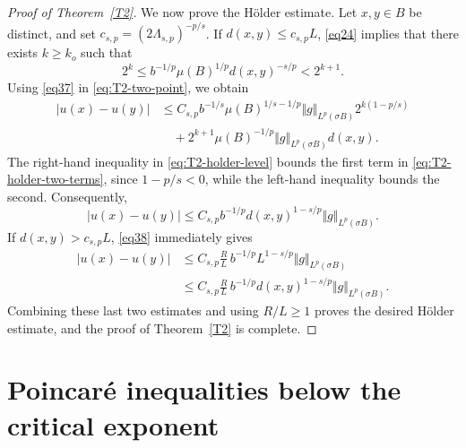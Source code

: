 \documentclass[12pt,leqno]{amsart}
\theoremstyle{definition}
\numberwithin{theorem}{section} \numberwithin{equation}{section}
\begin{document}
\begin{proof}[Proof of Theorem~\ref{T2}]
We now prove the H\"older estimate.
Let $x,y\in B$ be distinct, and set
$c_{s,p}=(2\Lambda_{s,p})^{-p/s}$.
If $d(x,y)\leq c_{s,p}L$, \eqref{eq24} implies that there exists
$k\geq k_o$ such that
%
\begin{equation}
\label{eq:T2-holder-level}
 2^k\leq b^{-1/p}\mu(B)^{1/p}d(x,y)^{-s/p}<2^{k+1}.
\end{equation}
%
Using \eqref{eq37} in \eqref{eq:T2-two-point}, we obtain
%
\begin{equation}
\label{eq:T2-holder-two-terms}
\begin{split}
 |u(x)-u(y)|
 &\leq C_{s,p}b^{-1/s}\mu(B)^{1/s-1/p}
       \Vert g\Vert_{L^p(\sigma B)}2^{k(1-p/s)}\\
 &\quad+2^{k+1}\mu(B)^{-1/p}
       \Vert g\Vert_{L^p(\sigma B)}d(x,y).
\end{split}
\end{equation}
The right-hand inequality in \eqref{eq:T2-holder-level} bounds the
first term in \eqref{eq:T2-holder-two-terms}, since $1-p/s<0$,
while the left-hand inequality bounds the second. Consequently,
\[
 |u(x)-u(y)|
 \leq C_{s,p}b^{-1/p}d(x,y)^{1-s/p}
       \Vert g\Vert_{L^p(\sigma B)}.
\]
If $d(x,y)>c_{s,p}L$, \eqref{eq38} immediately gives
\[
\begin{split}
 |u(x)-u(y)|
 &\leq C_{s,p}\frac RL\,b^{-1/p}L^{1-s/p}
       \Vert g\Vert_{L^p(\sigma B)}\\
 &\leq C_{s,p}\frac RL\,b^{-1/p}d(x,y)^{1-s/p}
       \Vert g\Vert_{L^p(\sigma B)}.
\end{split}
\]
Combining these last two estimates and using $R/L\geq1$ proves the desired
H\"older estimate, and the proof of Theorem~\ref{T2} is complete.
\end{proof}

\section{Poincar\'e inequalities below the critical exponent}
\end{document}
